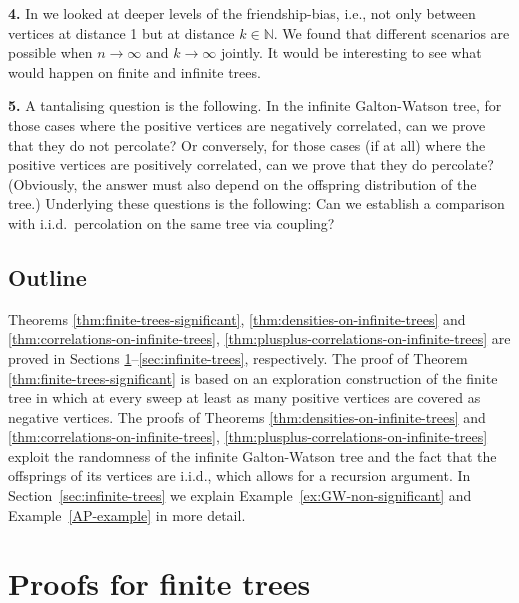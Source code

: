 \documentclass[11pt]{article}
\numberwithin{equation}{section}
\theoremstyle{plain}
\newcommand{\N}{\mathbb N}
\begin{document}
\medskip\noindent
{\bf 4.} 
In \cite{HHP2} we looked at deeper levels of the friendship-bias, i.e., not only between vertices at distance 1 but at distance $k \in \N$. We found that different scenarios are possible when $n \to \infty$ and $k \to \infty$ jointly. It would be interesting to see what would happen on finite and infinite trees. 

\medskip\noindent
{\bf 5.} 
A tantalising question is the following. In the infinite Galton-Watson tree, for those cases where the positive vertices are negatively correlated, can we prove that they do not percolate? Or conversely, for those cases (if at all) where the positive vertices are positively correlated, can we prove that they do percolate? (Obviously, the answer must also depend on the offspring distribution of the tree.) Underlying these questions is the following: Can we establish a comparison with i.i.d.\ percolation on the same tree via coupling?    




\subsection{Outline}
\label{sec:outline}

Theorems \ref{thm:finite-trees-significant}, \ref{thm:densities-on-infinite-trees} and \ref{thm:correlations-on-infinite-trees}, \ref{thm:plusplus-correlations-on-infinite-trees} are proved in Sections \ref{sec:finite-trees}--\ref{sec:infinite-trees}, respectively. The proof of Theorem \ref{thm:finite-trees-significant} is based on an exploration construction of the finite tree in which at every sweep at least as many positive vertices are covered as negative vertices. The proofs of Theorems \ref{thm:densities-on-infinite-trees} and \ref{thm:correlations-on-infinite-trees}, \ref{thm:plusplus-correlations-on-infinite-trees} exploit the randomness of the infinite Galton-Watson tree and the fact that the offsprings of its vertices are i.i.d., which allows for a recursion argument.  In Section~\ref{sec:infinite-trees} we explain Example~\ref{ex:GW-non-significant} and Example~\ref{AP-example} in more detail.






\section{Proofs for finite trees}
\label{sec:finite-trees}
\end{document}
